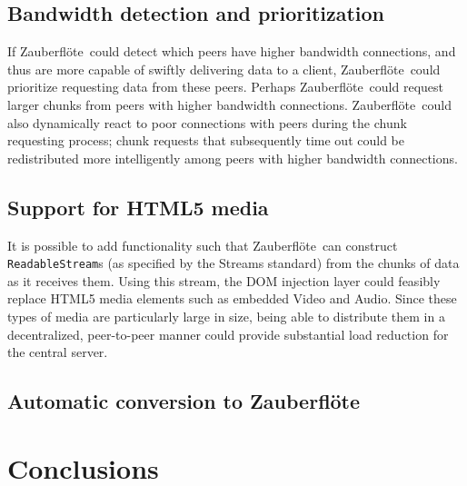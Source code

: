 \documentclass[letterpaper,twocolumn,10pt]{article}
\newcommand{\zbf}{Zauberfl\"{o}te}
\begin{document}
\subsection{Bandwidth detection and prioritization}

If \zbf\ could detect which peers have higher bandwidth connections, and thus
are more capable of swiftly delivering data to a client, \zbf\ could prioritize
requesting data from these peers. Perhaps \zbf\ could request larger chunks from
peers with higher bandwidth connections. \zbf\ could also dynamically react to
poor connections with peers during the chunk requesting process; chunk requests
that subsequently time out could be redistributed more intelligently among
peers with higher bandwidth connections.

\subsection{Support for HTML5 media}
It is possible to add functionality such that \zbf\ can construct \texttt{ReadableStream}s (as specified by the Streams standard) %
from the chunks of data as it receives them. Using this stream, the DOM injection layer could feasibly replace HTML5 media elements such as embedded Video and Audio. Since these types of media are particularly large in size, being able to distribute them in a decentralized, peer-to-peer manner could provide substantial load reduction for the central server.

\subsection{Automatic conversion to \zbf }

\section{Conclusions}



{\footnotesize 
}
\end{document}
